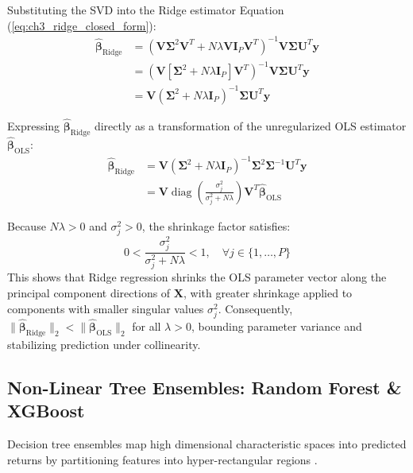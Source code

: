 Substituting the SVD into the Ridge estimator Equation (\ref{eq:ch3_ridge_closed_form}):
\begin{align}
\hat{\boldsymbol{\beta}}_{\text{Ridge}} &= \left( \mathbf{V} \mathbf{\Sigma}^2 \mathbf{V}^T + N \lambda \mathbf{V} \mathbf{I}_P \mathbf{V}^T \right)^{-1} \mathbf{V} \mathbf{\Sigma} \mathbf{U}^T \mathbf{y} \\
&= \left( \mathbf{V} [ \mathbf{\Sigma}^2 + N \lambda \mathbf{I}_P ] \mathbf{V}^T \right)^{-1} \mathbf{V} \mathbf{\Sigma} \mathbf{U}^T \mathbf{y} \\
&= \mathbf{V} \left( \mathbf{\Sigma}^2 + N \lambda \mathbf{I}_P \right)^{-1} \mathbf{\Sigma} \mathbf{U}^T \mathbf{y}
\label{eq:ch3_ridge_svd}
\end{align}

Expressing $\hat{\boldsymbol{\beta}}_{\text{Ridge}}$ directly as a transformation of the unregularized OLS estimator $\hat{\boldsymbol{\beta}}_{\text{OLS}}$:
\begin{align}
\hat{\boldsymbol{\beta}}_{\text{Ridge}} &= \mathbf{V} \left( \mathbf{\Sigma}^2 + N \lambda \mathbf{I}_P \right)^{-1} \mathbf{\Sigma}^2 \mathbf{\Sigma}^{-1} \mathbf{U}^T \mathbf{y} \\
&= \mathbf{V} \operatorname{diag}\left( \frac{\sigma_j^2}{\sigma_j^2 + N \lambda} \right) \mathbf{V}^T \hat{\boldsymbol{\beta}}_{\text{OLS}}
\label{eq:ch3_ridge_shrinkage_matrix}
\end{align}

Because $N \lambda > 0$ and $\sigma_j^2 > 0$, the shrinkage factor satisfies:
\begin{equation}
0 < \frac{\sigma_j^2}{\sigma_j^2 + N \lambda} < 1, \quad \forall j \in \{1, \dots, P\}
\end{equation}
This shows that Ridge regression shrinks the OLS parameter vector along the principal component directions of $\mathbf{X}$, with greater shrinkage applied to components with smaller singular values $\sigma_j^2$. Consequently, $\|\hat{\boldsymbol{\beta}}_{\text{Ridge}}\|_2 < \|\hat{\boldsymbol{\beta}}_{\text{OLS}}\|_2$ for all $\lambda > 0$, bounding parameter variance and stabilizing prediction under collinearity.

\subsection{Non-Linear Tree Ensembles: Random Forest \& XGBoost}
\label{subsec:ch3_tree_ensembles}

Decision tree ensembles map high dimensional characteristic spaces into predicted returns by partitioning features into hyper-rectangular regions \citep{gu2020empirical}.

